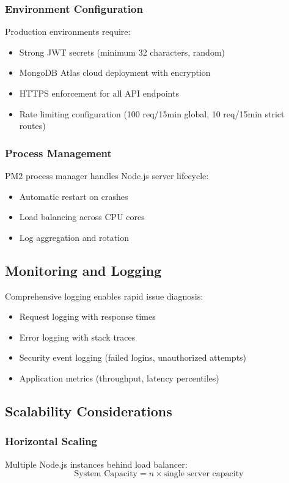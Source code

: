 \documentclass[conference]{IEEEtran}
\begin{document}
\subsubsection{Environment Configuration}
Production environments require:
\begin{itemize}
\item Strong JWT secrets (minimum 32 characters, random)
\item MongoDB Atlas cloud deployment with encryption
\item HTTPS enforcement for all API endpoints
\item Rate limiting configuration (100 req/15min global, 10 req/15min strict routes)
\end{itemize}

\subsubsection{Process Management}
PM2 process manager handles Node.js server lifecycle:
\begin{itemize}
\item Automatic restart on crashes
\item Load balancing across CPU cores
\item Log aggregation and rotation
\end{itemize}

\subsection{Monitoring and Logging}

Comprehensive logging enables rapid issue diagnosis:
\begin{itemize}
\item Request logging with response times
\item Error logging with stack traces
\item Security event logging (failed logins, unauthorized attempts)
\item Application metrics (throughput, latency percentiles)
\end{itemize}

\subsection{Scalability Considerations}

\subsubsection{Horizontal Scaling}
Multiple Node.js instances behind load balancer:
\begin{equation}
\text{System Capacity} = n \times \text{single server capacity}
\end{equation}
\end{document}
